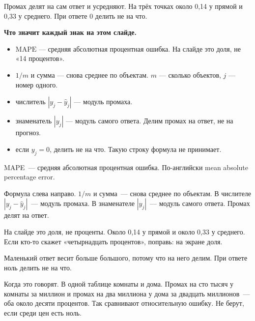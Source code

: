 \documentclass[11pt,a4paper]{article}
\newcommand{\slidehead}[2]{\par\vspace{4mm}{\color{navy}\large\bfseries Слайд #1. #2}\par\vspace{1mm}}
\newcommand{\screen}[1]{\par{\color{ink}\small #1\par}\vspace{1mm}}
\newcommand{\say}[1]{\begin{saybox}#1\end{saybox}}
\newenvironment{signs}{\begin{signbox}{\bfseries Что значит каждый знак на этом слайде.}\par\begin{itemize}[leftmargin=1.15em,itemsep=2pt,topsep=3pt,parsep=0pt]}{\end{itemize}\end{signbox}}
\begin{document}
\slidehead{24}{MAPE}
\screen{Промах делят на сам ответ и усредняют. На трёх точках около 0,14 у прямой и 0,33 у среднего. При ответе 0 делить не на что.}
\begin{signs}
\item \(\mathrm{MAPE}\) — средняя абсолютная процентная ошибка. На слайде это доля, не «14 процентов».
\item \(1/m\) и сумма — снова среднее по объектам. \(m\) — сколько объектов, \(j\) — номер одного.
\item числитель \(|y_j-\hat y_j|\) — модуль промаха.
\item знаменатель \(|y_j|\) — модуль самого ответа. Делим промах на ответ, не на прогноз.
\item если \(y_j=0\), делить не на что. Такую строку формула не принимает.
\end{signs}
\say{MAPE~--- средняя абсолютная процентная ошибка. По-английски mean absolute percentage error.

Формула слева направо. \(1/m\) и сумма~--- снова среднее по объектам. В числителе \(|y_j-\hat y_j|\)~--- модуль промаха. В знаменателе \(|y_j|\)~--- модуль самого ответа. Промах делят на ответ.

На слайде это доля, не проценты. Около 0,14 у прямой и около 0,33 у среднего. Если кто-то скажет «четырнадцать процентов», поправь: на экране доля.

Маленький ответ весит больше большого, потому что на него делим. При ответе ноль делить не на что.

Когда это говорят. В одной таблице комнаты и дома. Промах на сто тысяч у комнаты за миллион и промах на два миллиона у дома за двадцать миллионов~--- оба около десяти процентов. Так сравнивают относительную ошибку. Не берут, если среди цен есть ноль.}
\end{document}
